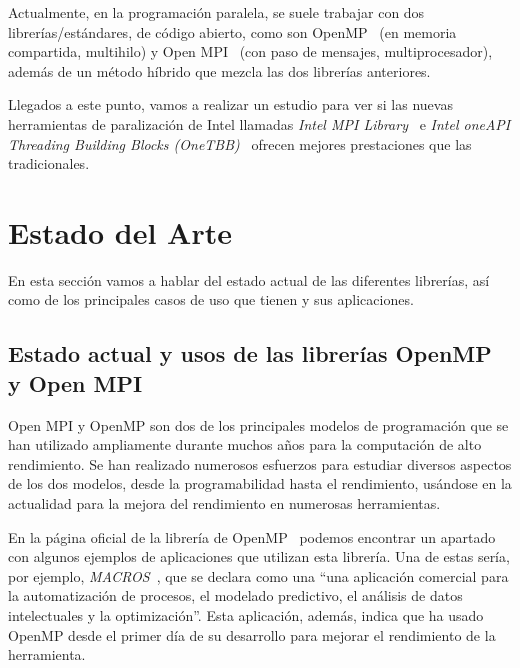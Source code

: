 \documentclass[a4paper,12pt]{article}
\begin{document}
Actualmente, en la programación paralela, se suele trabajar con dos librerías/estándares, de código abierto, como son OpenMP~\cite{openmp} (en memoria compartida, multihilo) y  Open MPI~\cite{openmpi} (con paso de mensajes, multiprocesador), además de un método híbrido que mezcla las dos librerías anteriores.

Llegados a este punto, vamos a realizar un estudio para ver si las nuevas herramientas de paralización de Intel llamadas {\it Intel MPI Library}~\cite{impi} e {\it Intel oneAPI Threading Building Blocks (OneTBB)}~\cite{tbb} ofrecen mejores prestaciones que las tradicionales.

\newpage
\section{Estado del Arte} \label{sec:estado_arte}

En esta sección vamos a hablar del estado actual de las diferentes librerías, así como de los principales casos de uso que tienen y sus aplicaciones.

\subsection{Estado actual y usos de las librerías OpenMP y Open MPI}

Open MPI y OpenMP son dos de los principales modelos de programación que se han utilizado ampliamente durante muchos años para la computación de alto rendimiento. Se han realizado numerosos esfuerzos para estudiar diversos aspectos de los dos modelos, desde la programabilidad hasta el rendimiento, usándose en la actualidad para la mejora del rendimiento en numerosas herramientas.

En la página oficial de la librería de OpenMP~\cite{who} podemos encontrar un apartado con algunos ejemplos de aplicaciones que utilizan esta librería. Una de estas sería, por ejemplo, {\it MACROS}~\cite{macros}, que se declara como una ``una aplicación comercial para la automatización de procesos, el modelado predictivo, el análisis de datos intelectuales y la optimización''. Esta aplicación, además, indica que ha usado OpenMP desde el primer día de su desarrollo para mejorar el rendimiento de la herramienta.

\end{document}
